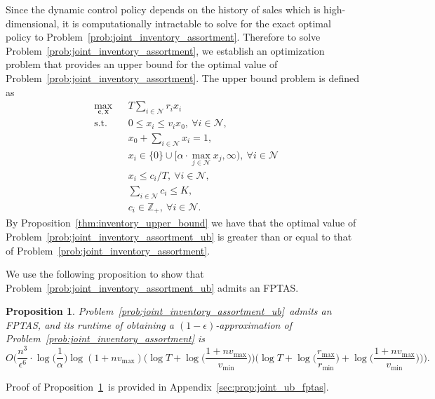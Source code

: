 \documentclass[mnsc,non-blindrev]{informs3}
\newtheorem{proposition}[theorem]{Proposition}
\theoremstyle{definition}
\begin{document}
\begin{appendices}{\Large{}}
{Since the dynamic control policy depends on the history of sales which is high-dimensional, it is computationally intractable to solve for the exact optimal policy to Problem~\eqref{prob:joint_inventory_assortment}. Therefore to solve Problem~\eqref{prob:joint_inventory_assortment}, we establish an optimization problem that provides an upper bound for the optimal value of Problem~\eqref{prob:joint_inventory_assortment}. The upper bound problem is defined as
\begin{equation}\label{prob:joint_inventory_assortment_ub}
\begin{aligned}
&\max_{\bm{c},\bm{x}}&&T\sum_{i\in\mathcal{N}}r_ix_i\\
&\text{s.t.}&&0\leq x_i\leq v_ix_0,\ \forall i\in\mathcal{N},\\
&&&x_0+\sum_{i\in\mathcal{N}}x_i=1,\\
&&&x_i\in\{0\}\cup\Big[\alpha\cdot\max_{j\in\mathcal{N}}x_j,\infty\Big),\ \forall i\in\mathcal{N}\\
&&&x_i\leq c_i/T,\ \forall i\in\mathcal{N},\\
&&&\sum_{i\in\mathcal{N}}c_i\leq K,\\
&&&c_i\in\mathbb{Z}_+,\ \forall i\in\mathcal{N}.
\end{aligned}
\end{equation}
By Proposition~\ref{thm:inventory_upper_bound} we have that the optimal value of Problem~\eqref{prob:joint_inventory_assortment_ub} is greater than or equal to that of Problem~\eqref{prob:joint_inventory_assortment}.

We use the following proposition to show that Problem~\eqref{prob:joint_inventory_assortment_ub} admits an FPTAS.

\begin{proposition}\label{prop:joint_ub_fptas}
Problem~\eqref{prob:joint_inventory_assortment_ub}~admits an FPTAS, and its runtime of obtaining a $(1-\epsilon)$-approximation of Problem~\eqref{prob:joint_inventory_assortment} is
\begin{equation*}
O\Big(\dfrac{n^3}{\epsilon^6}\cdot\log\Big(\dfrac{1}{\alpha}\Big)\log(1+nv_{\max})\Big(\log T+\log\Big(\dfrac{1+nv_{\max}}{v_{\min}}\Big)\Big)\Big(\log T+\log\Big(\dfrac{r_{\max}}{r_{\min}}\Big)+\log\Big(\dfrac{1+nv_{\max}}{v_{\min}}\Big)\Big)\Big).
\end{equation*}
\end{proposition}

Proof of Proposition~\ref{prop:joint_ub_fptas}~is provided in Appendix~\ref{sec:prop:joint_ub_fptas}.

}
\end{appendices}
\end{document}
